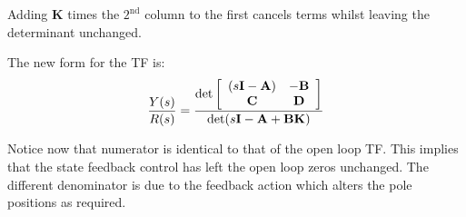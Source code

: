 Adding $\mathbf{K}$ times the $2^\mathrm{nd}$ column to the first cancels terms whilst leaving the determinant unchanged.

The new form for the TF is:
\[
\frac{{Y(s)}}{{R(s)}} = \frac{{\det \left[ {\begin{array}{*{20}c}
   {(s{\bf{I}} - {\bf{A}})} & { - {\bf{B}}}  \\
   {\bf{C}} & {\bf{D}}  \\
\end{array}} \right]}}{{\det (s{\bf{I}} - {\bf{A}} + {\bf{BK}})}}
\]

Notice now that numerator is identical to that of the open loop TF. This implies that the state feedback control has left the open loop zeros unchanged. The different denominator is due to the feedback action which alters the pole positions as required.

\endinput

